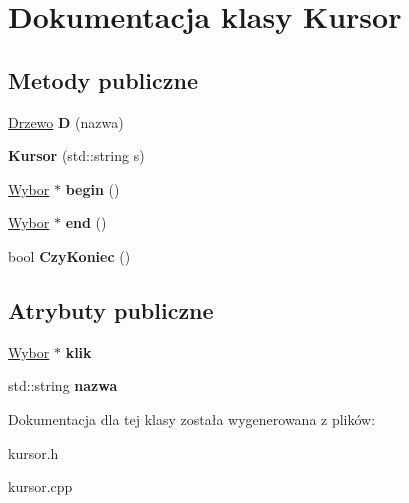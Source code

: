 \hypertarget{classKursor}{\section{Dokumentacja klasy Kursor}
\label{classKursor}
}
\subsection*{Metody publiczne}
\begin{DoxyCompactItemize}
\item 
\hypertarget{classKursor_a0fb30ecfc58013cdc90342ae3607f0a9}{\hyperlink{classDrzewo}{Drzewo} {\bfseries D} (nazwa)}\label{classKursor_a0fb30ecfc58013cdc90342ae3607f0a9}

\item 
\hypertarget{classKursor_a5a53805156ce8c8f5a3a2c433cc7ec9b}{{\bfseries Kursor} (std\-::string s)}\label{classKursor_a5a53805156ce8c8f5a3a2c433cc7ec9b}

\item 
\hypertarget{classKursor_aea39ca8947e07689130c7a4db87c8caf}{\hyperlink{classWybor}{Wybor} $\ast$ {\bfseries begin} ()}\label{classKursor_aea39ca8947e07689130c7a4db87c8caf}

\item 
\hypertarget{classKursor_aec56c3609f26bc2f80f31f24319dfa01}{\hyperlink{classWybor}{Wybor} $\ast$ {\bfseries end} ()}\label{classKursor_aec56c3609f26bc2f80f31f24319dfa01}

\item 
\hypertarget{classKursor_a61dd8d61b831c4c09c0d5c579be6a1e2}{bool {\bfseries Czy\-Koniec} ()}\label{classKursor_a61dd8d61b831c4c09c0d5c579be6a1e2}

\end{DoxyCompactItemize}
\subsection*{Atrybuty publiczne}
\begin{DoxyCompactItemize}
\item 
\hypertarget{classKursor_a41bdb41946edcff5fe16dca97a88c9da}{\hyperlink{classWybor}{Wybor} $\ast$ {\bfseries klik}}\label{classKursor_a41bdb41946edcff5fe16dca97a88c9da}

\item 
\hypertarget{classKursor_adafd1349fc5c8a7b65b38fc5ddb5da71}{std\-::string {\bfseries nazwa}}\label{classKursor_adafd1349fc5c8a7b65b38fc5ddb5da71}

\end{DoxyCompactItemize}


Dokumentacja dla tej klasy została wygenerowana z plików\-:\begin{DoxyCompactItemize}
\item 
kursor.\-h\item 
kursor.\-cpp\end{DoxyCompactItemize}
